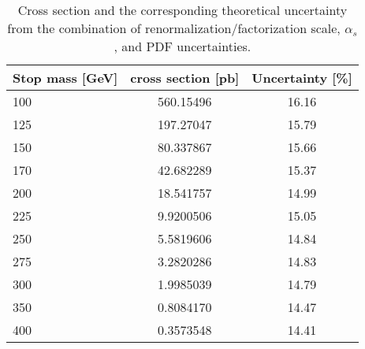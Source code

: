 \begin{table}[tb]
\begin{center}
\begin{tabular}{lcc} 
\hline\hline
Stop mass [GeV] & cross section [pb] & Uncertainty [\%]\\
       \hline
       100 & 560.15496 & 16.16\\
       125 & 197.27047 & 15.79\\
       150 & 80.337867 & 15.66\\
       170 & 42.682289 & 15.37\\
       200 & 18.541757 & 14.99\\
       225 & 9.9200506 & 15.05\\
       250 & 5.5819606 & 14.84\\
       275 & 3.2820286 & 14.83\\
       300 & 1.9985039 & 14.79\\
       350 & 0.8084170 & 14.47\\
       400 & 0.3573548 & 14.41\\
       \hline\hline
\end{tabular}
\end{center}
\caption{Cross section and the corresponding theoretical uncertainty from the
  combination of renormalization/factorization scale, $\alpha_s$, and PDF uncertainties.} 
 \label{tab:signalxsecuncert}
 \end{table}
